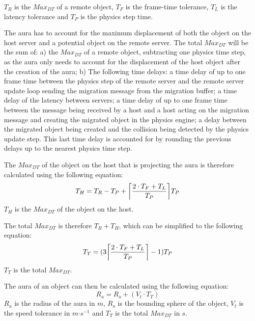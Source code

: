 $T_{R}$ is the $Max_{DT}$ of a remote object, $T_{F}$ is the frame-time tolerance, $T_{L}$ is the latency tolerance and $T_{P}$ is the physics step time.

The aura has to account for the maximum displacement of both the object on the host server and a potential object on the remote server. The total $Max_{DT}$ will be the sum of: a) the $Max_{DT}$ of a remote object, subtracting one physics time step, as the aura only needs to account for the displacement of the host object after the creation of the aura; b) The following time delays: a time delay of up to one frame time between the physics step of the remote server and the remote server update loop sending the migration message from the migration buffer; a time delay of the latency between servers; a time delay of up to one frame time between the message being received by a host and a host acting on the migration message and creating the migrated object in the physics engine; a delay between the migrated object being created and the collision being detected by the physics update step. This last time delay is accounted for by rounding the previous delays up to the nearest physics time step.

The $Max_{DT}$ of the object on the host that is projecting the aura is therefore calculated using the following equation:
\begin{equation}
T_{H}=T_{R}-T_{P}+\ceil*{\frac{2\cdot T_{F} + T_{L}}{T_{P}}}T_{P}
\end{equation}
$T_{H}$ is the $Max_{DT}$ of the object on the host.

The total $Max_{DT}$ is therefore $T_{R}+T_{H}$, which can be simplified to the following equation:
\begin{equation}
T_{T}=(3\ceil*{\frac{2\cdot T_{F} + T_{L}}{T_{P}}}-1)T_{P}
\end{equation}
$T_{T}$ is the total $Max_{DT}$.

The aura of an object can then be calculated using the following equation: 
\begin{equation}
R_{a}=R_{o}+(V_{t}\cdot T_{T})
\end{equation}
$R_{a}$ is the radius of the aura in $m$, $R_{o}$ is the bounding sphere of the object, $V_{t}$ is the speed tolerance in $m\mathord{\cdot}s^{-1}$ and $T_{T}$ is the total $Max_{DT}$ in $s$.

